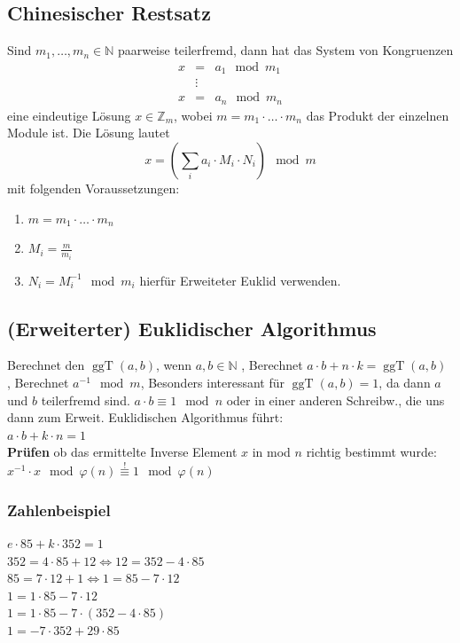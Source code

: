 \documentclass[8pt,a4paper,landscape]{article}
\begin{document}
\begin{multicols}{4}
\subsection{Chinesischer Restsatz}
Sind \(m_{1}, \dots, m_{n} \in \mathbb{N}\) paarweise teilerfremd, dann hat das System von Kongruenzen 
\begin{eqnarray}
x &=& a_{1} \mod m_{1} \nonumber\\
&\vdots & \nonumber \\
x &=& a_{n} \mod m_{n} \nonumber
\end{eqnarray}
eine eindeutige Lösung \(x \in \mathbb{Z}_{m}\), wobei \(m=m_{1} \cdot \dots \cdot m_{n}\) das Produkt der einzelnen Module ist.
Die Lösung lautet 
\[
    x = \left( \sum_{i} a_{i} \cdot M_{i} \cdot N_{i} \right) \mod m
\]
mit folgenden Voraussetzungen:
\begin{enumerate}
\item \(m=m_{1} \cdot \dots \cdot m_{n}\)  
\item \(M_{i} = \frac{m}{m_{i}}\)
\item \( N_{i} = M_{i}^{-1} \mod m_i\) hierfür Erweiteter Euklid verwenden. \end{enumerate}


\subsection{(Erweiterter) Euklidischer Algorithmus}

Berechnet den \(\operatorname{ggT}(a,{}b)\), wenn $a,b \in \mathbb{N}$
, Berechnet \(a \cdot b + n \cdot k = \operatorname{ggT}(a,{}b)\)
, Berechnet \(a^{-1} \mod m\), Besonders interessant für \(\operatorname{ggT}(a,{}b)=1\), da dann \(a\) und \(b\) teilerfremd sind. $a \cdot b \equiv 1 \mod n$ oder in einer anderen Schreibw., die uns dann zum Erweit. Euklidischen Algorithmus führt: \\
$a \cdot b + k \cdot n = 1$ \\
\textbf{Prüfen} ob das ermittelte Inverse Element $x$ in mod $n$ richtig bestimmt wurde:\\  $ x^{-1}\cdot x \mod \varphi(n) \overset{!}{\equiv}1 \mod \varphi(n)$
\subsubsection{Zahlenbeispiel}
$e\cdot85+k\cdot352 = 1$\\
$352 = 4\cdot85+12		\Leftrightarrow		12 = 352-4\cdot85$\\
$85 = 7\cdot12+1		\Leftrightarrow 	1 = 85-7\cdot12$\\
$1 = 1\cdot85-7\cdot12$\\
$1 = 1\cdot85-7\cdot(352-4\cdot85)$\\
$1 = -7\cdot352+29\cdot85$

\end{multicols}
\end{document}
